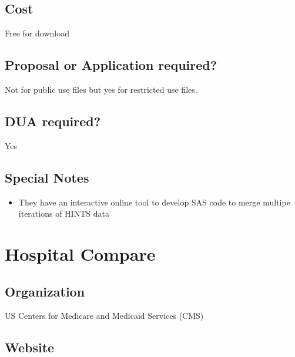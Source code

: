 \documentclass[
]{book}
\providecommand{\tightlist}{%
  \setlength{\itemsep}{0pt}\setlength{\parskip}{0pt}}
\begin{document}
\hypertarget{cost-31}{%
\section{Cost}\label{cost-31}}

Free for download

\hypertarget{proposal-or-application-required-31}{%
\section{Proposal or Application required?}\label{proposal-or-application-required-31}}

Not for public use files but yes for restricted use files.

\hypertarget{dua-required-31}{%
\section{DUA required?}\label{dua-required-31}}

Yes

\hypertarget{special-notes-31}{%
\section{Special Notes}\label{special-notes-31}}

\begin{itemize}
\tightlist
\item
  They have an interactive online tool to develop SAS code to merge multipe iterations of HINTS data
\end{itemize}

\mainmatter

\hypertarget{hospital-compare}{%
\chapter{Hospital Compare}\label{hospital-compare}}

\hypertarget{organization-32}{%
\section{Organization}\label{organization-32}}

US Centers for Medicare and Medicaid Services (CMS)

\hypertarget{website-32}{%
\section{Website}\label{website-32}}
\end{document}
